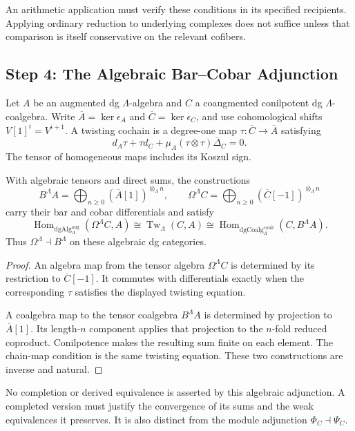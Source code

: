 An arithmetic application must verify these conditions in
its specified recipients. Applying ordinary reduction to
underlying complexes does not suffice unless that comparison
is itself conservative on the relevant cofibers.

\subsection{Step 4: The Algebraic Bar--Cobar Adjunction}
\label{v4-arith:pos:step-4}

Let \(A\) be an augmented dg \(\Lambda\)-algebra and \(C\)
a coaugmented conilpotent dg \(\Lambda\)-coalgebra.
Write \(\overline A=\ker\epsilon_A\) and
\(\overline C=\ker\epsilon_C\), and use cohomological shifts
\(V[1]^i=V^{i+1}\).
A twisting cochain is a degree-one map
\(\tau:\overline C\to\overline A\) satisfying
\[
 d_A\tau+\tau d_C+\mu_A(\tau\otimes\tau)\overline\Delta_C=0.
\]
The tensor of homogeneous maps includes its Koszul sign.

\begin{theorem}
\label{v4-arith:pos:thm:lambda-bar-cobar}
With algebraic tensors and direct sums, the constructions
\[
 B^\Lambda A=\bigoplus_{n\ge0}(\overline A[1])^{\otimes_\Lambda n},
 \qquad
 \Omega^\Lambda C=\bigoplus_{n\ge0}(\overline C[-1])^{\otimes_\Lambda n}
\]
carry their bar and cobar differentials and satisfy
\[
 \operatorname{Hom}_{\mathrm{dgAlg}^{\mathrm{aug}}_\Lambda}
       (\Omega^\Lambda C,A)
 \cong\operatorname{Tw}_\Lambda(C,A)
 \cong
 \operatorname{Hom}_{\mathrm{dgCoalg}^{\mathrm{conil}}_\Lambda}
       (C,B^\Lambda A).
\]
Thus \(\Omega^\Lambda\dashv B^\Lambda\) on these algebraic
dg categories.
\end{theorem}
\begin{proof}
An algebra map from the tensor algebra \(\Omega^\Lambda C\)
is determined by its restriction to \(\overline C[-1]\).
It commutes with differentials exactly when the corresponding
\(\tau\) satisfies the displayed twisting equation.

A coalgebra map to the tensor coalgebra \(B^\Lambda A\)
is determined by projection to \(\overline A[1]\).
Its length-\(n\) component applies that projection to the
\(n\)-fold reduced coproduct.
Conilpotence makes the resulting sum finite on each element.
The chain-map condition is the same twisting equation.
These two constructions are inverse and natural.
\end{proof}

No completion or derived equivalence is asserted by this
algebraic adjunction. A completed version must justify the
convergence of its sums and the weak equivalences it preserves.
It is also distinct from the module adjunction
\(\Phi_C\dashv\Psi_C\).

